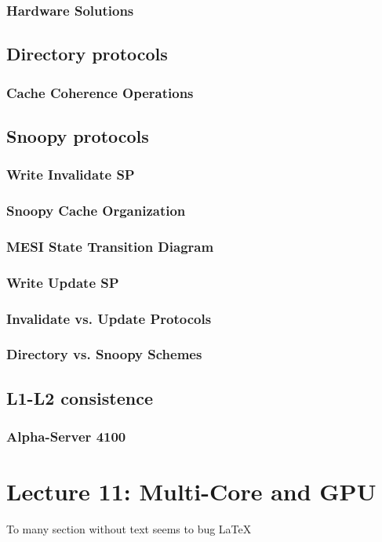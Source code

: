 \documentclass[titlepage, a4paper]{article}
\begin{document}
\subsubsection{Hardware Solutions}
\subsection{Directory protocols}
\subsubsection{Cache Coherence Operations}
\subsection{Snoopy protocols}
\subsubsection{Write Invalidate SP}
\subsubsection{Snoopy Cache Organization}
\subsubsection{MESI State Transition Diagram}
\subsubsection{Write Update SP}
\subsubsection{Invalidate vs. Update Protocols}
\subsubsection{Directory vs. Snoopy Schemes}
\subsection{L1-L2 consistence}
\subsubsection{Alpha-Server 4100}

\section{Lecture 11: Multi-Core and GPU}
To many section without text seems to bug \LaTeX
\end{document}
